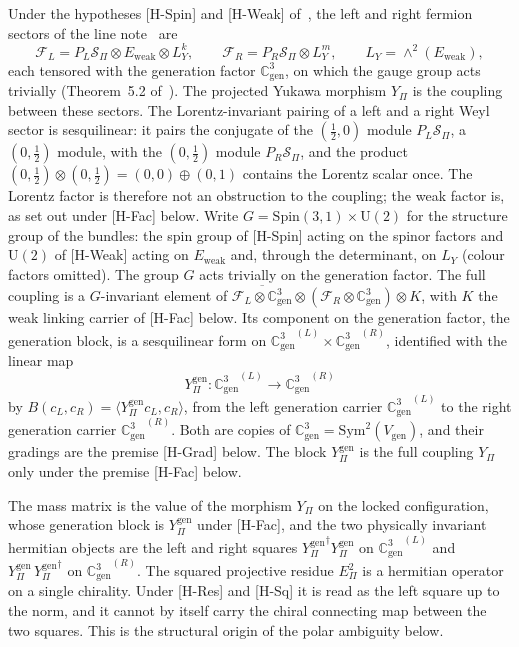 \documentclass[11pt]{article}
\theoremstyle{definition}
\theoremstyle{remark}
\newcommand{\Cgen}{\mathbb{C}^{3}_{\mathrm{gen}}}
\newcommand{\Epi}{E_{\Pi}}
\newcommand{\Sbundle}{\mathcal{S}_{\Pi}}
\newcommand{\Eweak}{E_{\mathrm{weak}}}
\newcommand{\GL}{{\Cgen}^{(L)}}
\newcommand{\GR}{{\Cgen}^{(R)}}
\newcommand{\LY}{L_{Y}}
\newcommand{\Ypi}{Y_{\Pi}}
\newcommand{\Ygen}{{Y^{\mathrm{gen}}_{\Pi}}}
\newcommand{\Sym}{\mathrm{Sym}}
\newcommand{\UU}{\mathrm{U}}
\begin{document}
    Under the hypotheses [H-Spin] and [H-Weak] of~\cite{Beau2026q14}, the left and right fermion sectors of the line
    note~\cite{Beau2026pyl} are
    \[
      \mathcal{F}_{L} = P_{L}\Sbundle \otimes \Eweak \otimes \LY^{k},
      \qquad
      \mathcal{F}_{R} = P_{R}\Sbundle \otimes \LY^{m},
      \qquad
      \LY = \wedge^{2}(\Eweak),
    \]
    each tensored with the generation factor $\Cgen$, on which the gauge group acts trivially (Theorem~5.2
    of~\cite{Beau2026q14}).
    The projected Yukawa morphism $\Ypi$ is the coupling between these sectors.
    The Lorentz-invariant pairing of a left and a right Weyl sector is sesquilinear: it pairs the conjugate of the
    $(\tfrac12, 0)$ module $P_{L}\Sbundle$, a $(0, \tfrac12)$ module, with the $(0, \tfrac12)$ module $P_{R}\Sbundle$,
    and the
    product $(0, \tfrac12) \otimes (0, \tfrac12) = (0, 0) \oplus (0, 1)$ contains the Lorentz scalar once.
    The Lorentz factor is therefore not an obstruction to the coupling; the weak factor is, as set out under
    [H-Fac] below.
    Write $G = \mathrm{Spin}(3,1) \times \UU(2)$ for the structure group of the bundles: the spin group of [H-Spin]
    acting on the spinor factors and $\UU(2)$ of [H-Weak] acting on $\Eweak$ and, through the determinant, on $\LY$
    (colour factors omitted).
    The group $G$ acts trivially on the generation factor.
    The full coupling is a $G$-invariant element of $\overline{\mathcal{F}_{L} \otimes \Cgen} \otimes
    (\mathcal{F}_{R} \otimes \Cgen) \otimes K$, with $K$ the weak linking carrier of [H-Fac] below.
    Its component on the generation factor, the generation block, is a sesquilinear form on $\GL \times \GR$,
    identified with the linear map
    \begin{equation}
      \label{eq:yukawa-morphism}
      \Ygen : \GL \longrightarrow \GR
    \end{equation}
    by $B(c_{L}, c_{R}) = \langle \Ygen c_{L}, c_{R} \rangle$, from the left generation carrier $\GL$ to the right
    generation
    carrier $\GR$.
    Both are copies of $\Cgen = \Sym^{2}(V_{\mathrm{gen}})$, and their gradings are the premise [H-Grad] below.
    The block $\Ygen$ is the full coupling $\Ypi$ only under the premise [H-Fac] below.

    The mass matrix is the value of the morphism $\Ypi$ on the locked configuration, whose generation block is
    $\Ygen$ under [H-Fac], and the two physically invariant
    hermitian objects are the left and right squares $\Ygen^{\dagger}\Ygen$ on $\GL$ and
    $\Ygen\,\Ygen^{\dagger}$ on $\GR$.
    The squared projective residue $\Epi^{2}$ is a hermitian operator on a single chirality.
    Under [H-Res] and [H-Sq] it is read as the left square up to the norm, and it cannot by itself carry
    the chiral connecting map between the two squares.
    This is the structural origin of the polar ambiguity below.
\end{document}
